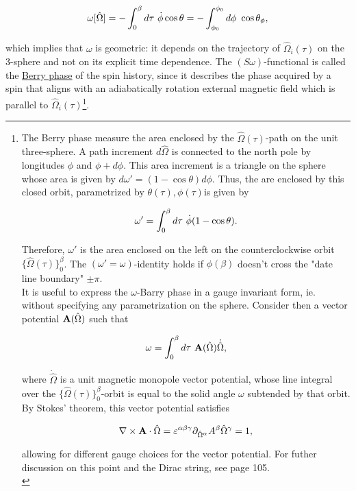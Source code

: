 \begin{equation}
    \omega[\hat{\Omega}] = -\int_{0}^\beta d\tau \textnormal{ } \dot{\phi} \cos \theta = - \int_{\phi_0}^{\phi_0} d\phi \textnormal{ } \cos \theta_\phi,
    \label{spin_wave_theoretic_wave_barry_phase}
\end{equation}

which implies that $\omega$ is geometric: it depends on the trajectory of $\hat{\Omega}_i(\tau)$ on the 3-sphere and not on its explicit time dependence. The $(S\omega)$-functional is called the \underline{Berry phase} of the spin history, since it describes the phase acquired by a spin that aligns with an adiabatically rotation external magnetic field which is parallel to $\hat{\Omega}_i(\tau)$\footnote{

The Berry phase measure the area enclosed by the $\hat{\Omega}(\tau)$-path on the unit three-sphere. A path increment $d\hat{\Omega}$ is connected to the north pole by longitudes $\phi$ and $\phi + d\phi$. This area increment is a triangle on the sphere whose area is given by $d\omega' = (1-\cos \theta) d\phi$. Thus, the are enclosed by this closed orbit, parametrized by $\theta(\tau), \phi(\tau)$is given by 

$$
    \omega' = \int_0^\beta d\tau \textnormal{ } \dot{\phi}(1-\cos \theta).
$$

Therefore, $\omega'$ is the area enclosed on the left on the counterclockwise orbit $\{\hat{\Omega}(\tau)\}_0^\beta$. The $(\omega' = \omega)$-identity holds if $\phi(\beta)$ doesn't cross the "date line boundary" $\pm \pi$. \\

It is useful to express the $\omega$-Barry phase in a gauge invariant form, ie. without specifying any parametrization on the sphere. Consider then a vector potential ${\bf A}(\hat{\Omega})$ such that 

$$
    \omega = \int_{0}^{\beta} d\tau \textnormal{ } {\bf A}(\hat{\Omega}) \dot{\hat{\Omega}},
$$

where $\dot{\hat{\Omega}}$ is a unit magnetic monopole vector potential, whose line integral over the $\{\hat{\Omega}(\tau)\}_0^\beta$-orbit is equal to the solid angle $\omega$ subtended by that orbit. By Stokes' theorem, this vector potential satisfies 

\begin{equation}
    \nabla \times {\bf A} \cdot \hat{\Omega} = \varepsilon^{\alpha\beta\gamma} \partial_{{\hat{\Omega}^\alpha}} A^\beta \hat{\Omega}^\gamma = 1,
\end{equation}

allowing for different gauge choices for the vector potential. For futher discussion on this point and the Dirac string, see \cite{assa} page 105. \\

}. \\

